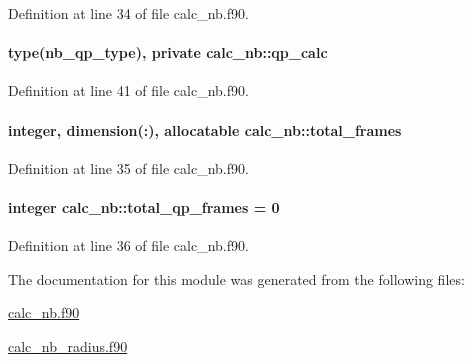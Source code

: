 Definition at line 34 of file calc\-\_\-nb.\-f90.

\hypertarget{classcalc__nb_ad1b1d273afd69b5db4d7d4ddc74264d9}{
\paragraph[{qp\-\_\-calc}]{\setlength{\rightskip}{0pt plus 5cm}type({\bf nb\-\_\-qp\-\_\-type}), private calc\-\_\-nb\-::qp\-\_\-calc\hspace{0.3cm}{\ttfamily [private]}}}\label{classcalc__nb_ad1b1d273afd69b5db4d7d4ddc74264d9}


Definition at line 41 of file calc\-\_\-nb.\-f90.

\hypertarget{classcalc__nb_a6a6b018f0e4740dd22802db5b67c5d4a}{
\paragraph[{total\-\_\-frames}]{\setlength{\rightskip}{0pt plus 5cm}integer, dimension(\-:), allocatable calc\-\_\-nb\-::total\-\_\-frames}}\label{classcalc__nb_a6a6b018f0e4740dd22802db5b67c5d4a}


Definition at line 35 of file calc\-\_\-nb.\-f90.

\hypertarget{classcalc__nb_a3eecb536afb1b6d651d1f853fc767a40}{
\paragraph[{total\-\_\-qp\-\_\-frames}]{\setlength{\rightskip}{0pt plus 5cm}integer calc\-\_\-nb\-::total\-\_\-qp\-\_\-frames = 0}}\label{classcalc__nb_a3eecb536afb1b6d651d1f853fc767a40}


Definition at line 36 of file calc\-\_\-nb.\-f90.



The documentation for this module was generated from the following files\-:\begin{DoxyCompactItemize}
\item 
\hyperlink{calc__nb_8f90}{calc\-\_\-nb.\-f90}\item 
\hyperlink{calc__nb__radius_8f90}{calc\-\_\-nb\-\_\-radius.\-f90}\end{DoxyCompactItemize}

